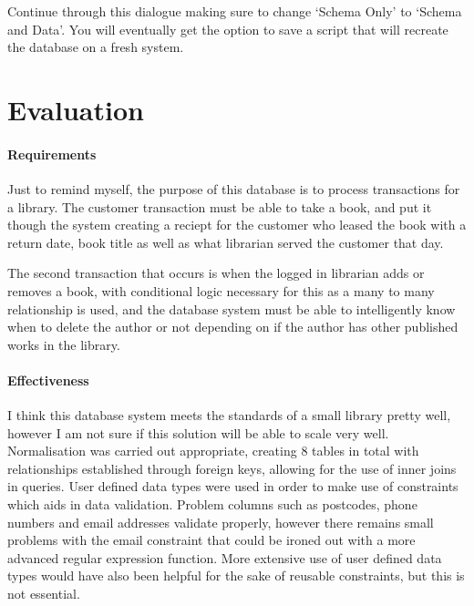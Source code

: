 \documentclass[11pt,a4paper]{scrartcl}
\begin{document}
	Continue through this dialogue making sure to change `Schema Only' to `Schema and Data'. You will eventually get the option to save a script that will recreate the database on a fresh system.
	
	\section{Evaluation}\label{evaluation}
	
	\paragraph{Requirements}
	
	Just to remind myself, the purpose of this database is to process transactions for a library. The customer transaction must be able to take a book, and put it though the system creating a reciept for the customer who leased the book with a return date, book title as well as what librarian served the customer that day.
	
	The second transaction that occurs is when the logged in librarian adds or removes a book, with conditional logic necessary for this as a many to many relationship is used, and the database system must be able to intelligently know when to delete the author or not depending on if the author has other published works in the library.
	
	\paragraph{Effectiveness}
	
	I think this database system meets the standards of a small library pretty well, however I am not sure if this solution will be able to scale very well. Normalisation was carried out appropriate, creating 8 tables in total with relationships established through foreign keys, allowing for the use of inner joins in queries. User defined data types were used in order to make use of constraints which aids in data validation. Problem columns such as postcodes, phone numbers and email addresses validate properly, however there remains small problems with the email constraint that could be ironed out with a more advanced regular expression function. More extensive use of user defined data types would have also been helpful for the sake of reusable constraints, but this is not essential.
\end{document}
